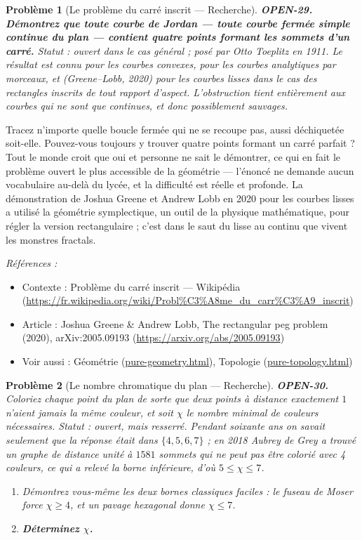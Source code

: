 \documentclass[11pt]{article}
\newtheorem{problem}{Problème}
\newenvironment{refs}{\par\small\noindent\emph{Références :}\begin{itemize}\setlength\itemsep{0pt}}{\end{itemize}\normalsize}
\begin{document}
\bigskip

\begin{problem}[{Le problème du carré inscrit --- Recherche}]
\textbf{OPEN-29.} \textbf{Démontrez que toute courbe de Jordan --- toute
courbe fermée simple continue du plan --- contient quatre points formant les sommets d'un
carré.} Statut : ouvert dans le cas général ; posé par Otto Toeplitz en 1911. Le
résultat est connu pour les courbes convexes, pour les courbes analytiques par morceaux,
et (Greene--Lobb, 2020) pour les courbes lisses dans le cas des \textit{rectangles} inscrits
de tout rapport d'aspect. L'obstruction tient entièrement aux courbes qui ne sont que
continues, et donc possiblement sauvages.
\end{problem}

\noindent Tracez n'importe quelle boucle fermée qui ne se recoupe pas, aussi
déchiquetée soit-elle. Pouvez-vous toujours y trouver quatre points formant un carré
parfait ? Tout le monde croit que oui et personne ne sait le démontrer, ce qui en fait le
problème ouvert le plus accessible de la géométrie --- l'énoncé ne demande aucun vocabulaire
au-delà du lycée, et la difficulté est réelle et profonde. La démonstration de Joshua
Greene et Andrew Lobb en 2020 pour les courbes lisses a utilisé la géométrie symplectique,
un outil de la physique mathématique, pour régler la version rectangulaire ; c'est dans le
saut du lisse au continu que vivent les monstres fractals.

\begin{refs}
\item Contexte : Problème du carré inscrit --- Wikipédia (\url{https://fr.wikipedia.org/wiki/Probl%C3%A8me_du_carr%C3%A9_inscrit})
\item Article : Joshua Greene \& Andrew Lobb, \og{} The rectangular peg problem \fg{} (2020), arXiv:2005.09193 (\url{https://arxiv.org/abs/2005.09193})
\item Voir aussi : Géométrie (\url{pure-geometry.html}), Topologie (\url{pure-topology.html})
\end{refs}

\bigskip

\begin{problem}[{Le nombre chromatique du plan --- Recherche}]
\textbf{OPEN-30.} Coloriez chaque point du plan de sorte que deux points à distance
exactement $ 1 $ n'aient jamais la même couleur, et soit $ \chi $ le nombre minimal de
couleurs nécessaires. Statut : ouvert, mais resserré. Pendant soixante ans on savait
seulement que la réponse était dans $ \{4,5,6,7\} $ ; en 2018 Aubrey de Grey a trouvé un
graphe de distance unité à $ 1581 $ sommets qui ne peut pas être colorié avec 4
couleurs, ce qui a relevé la borne inférieure, d'où $ 5 \leq \chi \leq 7 $.
\begin{enumerate}
\item[(a)] Démontrez vous-même les deux bornes classiques faciles : le fuseau de Moser force
$ \chi \geq 4 $, et un pavage hexagonal donne $ \chi \leq 7 $.
\item[(b)] \textbf{Déterminez $ \chi $.}
\end{enumerate}

\end{problem}
\end{document}
